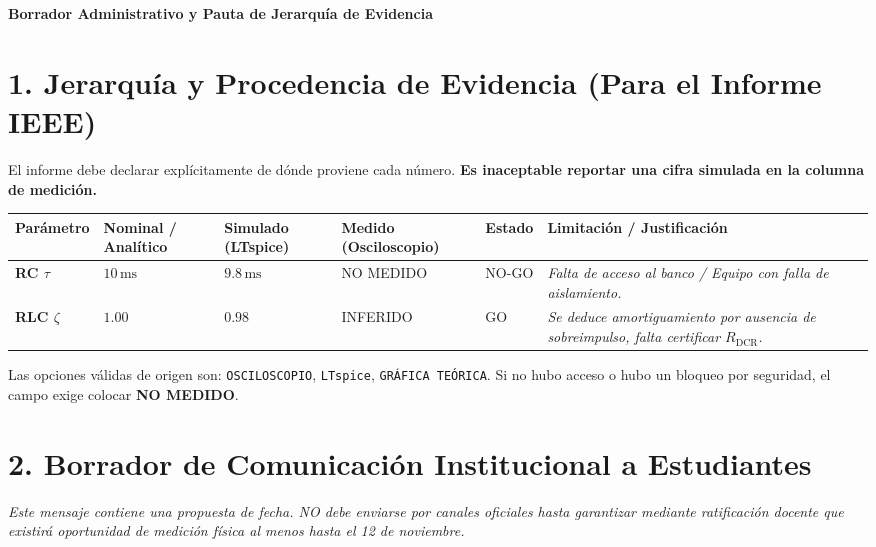 \documentclass[11pt, a4paper]{article}
\begin{document}
\begin{tcolorbox}[colback=ucbblue!5!white, colframe=ucbblue, title=\textbf{Artefacto A2: Estructuración Documental e Informe IEEE EC3}]
    \centering \textbf{Borrador Administrativo y Pauta de Jerarquía de Evidencia}
\end{tcolorbox}

\section*{1. Jerarquía y Procedencia de Evidencia (Para el Informe IEEE)}
El informe debe declarar explícitamente de dónde proviene cada número. \textbf{Es inaceptable reportar una cifra simulada en la columna de medición.}

\vspace{0.2cm}
\renewcommand{\arraystretch}{1.5}
\noindent
\begin{tabularx}{\textwidth}{
  >{\bfseries\RaggedRight\hsize=1.0\hsize}X 
  >{\centering\arraybackslash\hsize=0.8\hsize}X 
  >{\centering\arraybackslash\hsize=0.8\hsize}X 
  >{\centering\arraybackslash\hsize=0.8\hsize}X 
  >{\centering\arraybackslash\hsize=0.6\hsize}X 
  >{\RaggedRight\arraybackslash\hsize=2.0\hsize}X}
\toprule
\textbf{Parámetro} & \textbf{Nominal / Analítico} & \textbf{Simulado (LTspice)} & \textbf{Medido (Osciloscopio)} & \textbf{Estado} & \textbf{Limitación / Justificación} \\
\midrule
RC $\tau$ & $10\,\text{ms}$ & $9.8\,\text{ms}$ & NO MEDIDO & NO-GO & \textit{Falta de acceso al banco / Equipo con falla de aislamiento.} \\
RLC $\zeta$ & $1.00$ & $0.98$ & INFERIDO & GO & \textit{Se deduce amortiguamiento por ausencia de sobreimpulso, falta certificar $R_{\text{DCR}}$.} \\
\bottomrule
\end{tabularx}
\vspace{0.2cm}

Las opciones válidas de origen son: \texttt{OSCILOSCOPIO}, \texttt{LTspice}, \texttt{GRÁFICA TEÓRICA}. Si no hubo acceso o hubo un bloqueo por seguridad, el campo exige colocar \textbf{NO MEDIDO}.

\section*{2. Borrador de Comunicación Institucional a Estudiantes}
\textit{Este mensaje contiene una propuesta de fecha. NO debe enviarse por canales oficiales hasta garantizar mediante ratificación docente que existirá oportunidad de medición física al menos hasta el 12 de noviembre.}
\end{document}
